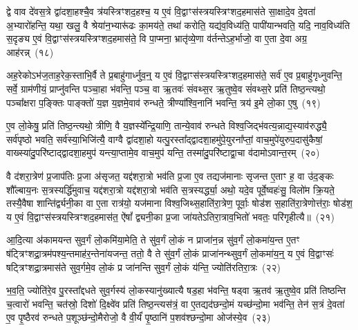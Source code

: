 द्वे वाव दे॑वस॒त्रे द्वा॑दशा॒हश्चै॒व त्र॑यस्त्रिꣳशद॒हश्च॒ य ए॒वं वि॒द्वाꣳस॑स्त्रयस्त्रिꣳशद॒हमास॑ते सा॒क्षादे॒व दे॒वता॑ अ॒भ्यारो॑हन्ति॒ यथा॒ खलु॒ वै श्रेया॑न॒भ्यारू॑ढः का॒मय॑ते॒ तथा॑ करोति॒ यद्य॑व॒विध्य॑ति॒ पापी॑यान्भवति॒ यदि॒ नाव॒विध्य॑ति स॒दृङ्य ए॒वं वि॒द्वाꣳस॑स्त्रयस्त्रिꣳशद॒हमास॑ते॒ वि पा॒प्मना॒ भ्रातृ॑व्ये॒णा व॑र्तन्ते\-ऽह॒र्भाजो॒ वा ए॒ता दे॒वा अग्र॒ आह॑रन्न्~(१८)\ip

अह॒रेको\-ऽभ॑ज॒ताह॒रेक॒स्ताभि॒र्वै ते प्र॒बाहु॑गार्ध्नुव॒न्॒ य ए॒वं वि॒द्वाꣳस॑स्त्रयस्त्रिꣳशद॒हमास॑ते॒ सर्व॑ ए॒व प्र॒बाहु॑गृध्नुवन्ति॒ सर्वे॒ ग्राम॑णीयं॒ प्राप्नु॑वन्ति पञ्चा॒हा भ॑वन्ति॒ पञ्च॒ वा ऋ॒तवः॑ संवथ्स॒र ऋ॒तुष्वे॒व सं॑वथ्स॒रे प्रति॑ तिष्ठ॒न्त्यथो॒ पञ्चा᳚क्षरा प॒ङ्क्तिः पाङ्क्तो॑ य॒ज्ञ य॒ज्ञमे॒वाव॑ रुन्धते॒ त्रीण्या᳚श्वि॒नानि॑ भवन्ति॒ त्रय॑ इ॒मे लो॒का ए॒षु~(१९)\ip

ए॒व लो॒केषु॒ प्रति॑ तिष्ठ॒न्त्यथो॒ त्रीणि॒ वै य॒ज्ञस्ये᳚न्द्रि॒याणि॒ तान्ये॒वाव॑ रुन्धते विश्व॒जिद्भ॑वत्य॒न्नाद्य॒स्याव॑रुद्ध्यै॒ सर्व॑पृष्ठो भवति॒ सर्व॑स्या॒भिजि॑त्यै॒ वाग्वै द्वा॑दशा॒हो यत्पु॒रस्ता᳚द्द्वादशा॒हमु॑पे॒युरना᳚प्तां॒ वाच॒मुपे॑युरुप॒दासु॑कैषां॒ वाख्स्या॑दु॒परि॑ष्टाद्द्वादशा॒हमुप॑ यन्त्या॒प्तामे॒व वाच॒मुप॑ यन्ति॒ तस्मा॑दु॒परि॑ष्टाद्वा॒चा व॑दामो\-ऽवान्त॒रम्~(२०)\ip

वै द॑शरा॒त्रेण॑ प्र॒जा\-प॑तिः प्र॒जा अ॑सृजत॒ यद्द॑शरा॒त्रो भव॑ति प्र॒जा ए॒व तद्यज॑मानाः सृजन्त ए॒ताꣳ ह॒ वा उ॑द॒ङ्कः शौ᳚ल्बाय॒नः स॒त्रस्यर्द्धि॑मुवाच॒ यद्द॑शरा॒त्रो यद्द॑शरा॒त्रो भव॑ति स॒त्रस्यर्द्ध्या॒ अथो॒ यदे॒व पूर्वे॒ष्वहः॑सु॒ विलो॑म क्रि॒यते॒ तस्यै॒वैषा शान्ति॑र्द्व्यनी॒का वा ए॒ता रात्र॑यो॒ यज॑माना विश्व॒जिथ्स॒हाति॑रा॒त्रेण॒ पूर्वाः॒ षोड॑श स॒हाति॑रा॒त्रेणोत्त॑राः॒ षोड॑श॒ य ए॒वं वि॒द्वाꣳस॑स्त्रयस्त्रिꣳशद॒हमास॑त॒ ऐ॑षां᳚ द्व्यनी॒का प्र॒जा जा॑यते\-ऽतिरा॒त्राव॒भितो॑ भवतः॒ परि॑गृहीत्यै॥~(२१)\ip

{\anuvakamend[{अ॒ह॒र॒न्ने॒ष्व॑वान्त॒रꣳ षोड॑श स॒ह स॒प्तद॑श च}]}

आ॒दि॒त्या अ॑कामयन्त सुव॒र्गं लो॒कमि॑या॒मेति॒ ते सु॑व॒र्गं लो॒कं न प्राजा॑न॒न्न सु॑व॒र्गं लो॒कमा॑य॒न्त ए॒तꣳ ष॑ट्त्रिꣳशद्रा॒त्रम॑पश्य॒न्तमाह॑र॒न्तेना॑यजन्त॒ ततो॒ वै ते सु॑व॒र्गं लो॒कं प्राजा॑नन्थ्सुव॒र्गं लो॒कमा॑य॒न्॒ य ए॒वं वि॒द्वाꣳसः॑ षट्त्रिꣳशद्रा॒त्रमास॑ते सुव॒र्गमे॒व लो॒कं प्र जा॑नन्ति सुव॒र्गं लो॒कं य॑न्ति॒ ज्योति॑रतिरा॒त्रः~(२२)\ip

भ॒व॒ति॒ ज्योति॑रे॒व पु॒रस्ता᳚द्दधते सुव॒र्गस्य॑ लो॒कस्यानु॑ख्यात्यै षड॒हा भ॑वन्ति॒ षड्वा ऋ॒तव॑ ऋ॒तुष्वे॒व प्रति॑ तिष्ठन्ति च॒त्वारो॑ भवन्ति॒ चत॑स्रो॒ दिशो॑ दि॒क्ष्वे॑व प्रति॑ तिष्ठ॒न्त्यस॑त्रं॒ वा ए॒तद्यद॑छन्दो॒मं यच्छ॑न्दो॒मा भव॑न्ति॒ तेन॑ स॒त्रं दे॒वता॑ ए॒व पृ॒ष्ठैरव॑ रुन्धते प॒शूञ्छ॑न्दो॒मैरोजो॒ वै वी॒र्यं॑ पृ॒ष्ठानि॑ प॒शव॑श्छन्दो॒मा ओज॑स्ये॒व~(२३)\ip

